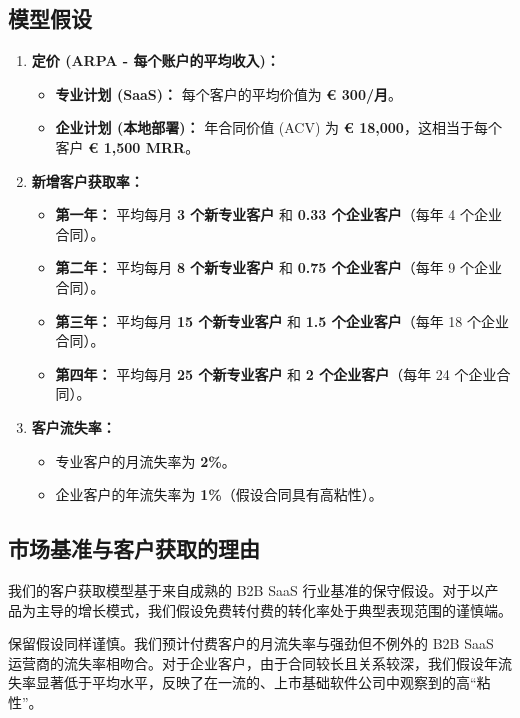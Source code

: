 \documentclass[11pt, a4paper, oneside]{article}
\begin{document}
\subsection{模型假设}
\begin{enumerate}
    \item \textbf{定价 (ARPA - 每个账户的平均收入)：}
    \begin{itemize}
        \item \textbf{专业计划 (SaaS)：} 每个客户的平均价值为 \textbf{\euro{} 300/月}。
        \item \textbf{企业计划 (本地部署)：} 年合同价值 (ACV) 为 \textbf{\euro{} 18,000}，这相当于每个客户 \textbf{\euro{} 1,500 MRR}。
    \end{itemize}

    \item \textbf{新增客户获取率：}
    \begin{itemize}
        \item \textbf{第一年：} 平均每月 \textbf{3 个新专业客户} 和 \textbf{0.33 个企业客户}（每年 4 个企业合同）。
        \item \textbf{第二年：} 平均每月 \textbf{8 个新专业客户} 和 \textbf{0.75 个企业客户}（每年 9 个企业合同）。
        \item \textbf{第三年：} 平均每月 \textbf{15 个新专业客户} 和 \textbf{1.5 个企业客户}（每年 18 个企业合同）。
        \item \textbf{第四年：} 平均每月 \textbf{25 个新专业客户} 和 \textbf{2 个企业客户}（每年 24 个企业合同）。
    \end{itemize}

    \item \textbf{客户流失率：}
    \begin{itemize}
        \item 专业客户的月流失率为 \textbf{2\%}。
        \item 企业客户的年流失率为 \textbf{1\%}（假设合同具有高粘性）。
    \end{itemize}
\end{enumerate}

\subsection{市场基准与客户获取的理由}

我们的客户获取模型基于来自成熟的 B2B SaaS 行业基准的保守假设。对于以产品为主导的增长模式，我们假设免费转付费的转化率处于典型表现范围的谨慎端。

保留假设同样谨慎。我们预计付费客户的月流失率与强劲但不例外的 B2B SaaS 运营商的流失率相吻合。对于企业客户，由于合同较长且关系较深，我们假设年流失率显著低于平均水平，反映了在一流的、上市基础软件公司中观察到的高“粘性”。
\end{document}
